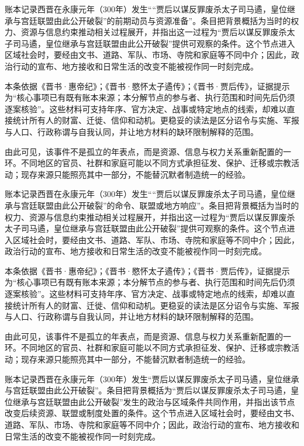 账本记录西晋在永康元年（300年）发生““贾后以谋反罪废杀太子司马遹，皇位继承与宫廷联盟由此公开破裂”的前期动员与资源准备”。条目把背景概括为当时的权力、资源与信息约束推动相关过程展开，并指出这一过程为“贾后以谋反罪废杀太子司马遹，皇位继承与宫廷联盟由此公开破裂”提供可观察的条件。这个节点进入区域社会时，要经由文书、道路、军队、市场、寺院和家庭等不同中介；因此，政治行动的宣布、地方接收和日常生活的改变不能被视作同一时刻完成。

本条依据《晋书·惠帝纪》；《晋书·愍怀太子遹传》；《晋书·贾后传》，证据提示为“核心事项已有既有账本来源；本分解节点的参与者、执行范围和时间先后仍须逐案核验”。这些材料可支持年序、官方决定、战事或特定地点的线索，却难以直接统计所有人的财富、迁徙、信仰和动机。更稳妥的读法是区分诏令与实施、军报与人口、行政称谓与自我认同，并让地方材料的缺环限制解释的范围。

由此可见，该事件不是孤立的年表点，而是资源、信息与权力关系重新配置的一环。不同地区的官员、社群和家庭可能以不同方式承担征发、保护、迁移或宗教活动；现存来源只能照亮其中一部分，不能替沉默者制造统一的经验。

账本记录西晋在永康元年（300年）发生““贾后以谋反罪废杀太子司马遹，皇位继承与宫廷联盟由此公开破裂”的命令、联盟或地方响应”。条目把背景概括为当时的权力、资源与信息约束推动相关过程展开，并指出这一过程为“贾后以谋反罪废杀太子司马遹，皇位继承与宫廷联盟由此公开破裂”提供可观察的条件。这个节点进入区域社会时，要经由文书、道路、军队、市场、寺院和家庭等不同中介；因此，政治行动的宣布、地方接收和日常生活的改变不能被视作同一时刻完成。

本条依据《晋书·惠帝纪》；《晋书·愍怀太子遹传》；《晋书·贾后传》，证据提示为“核心事项已有既有账本来源；本分解节点的参与者、执行范围和时间先后仍须逐案核验”。这些材料可支持年序、官方决定、战事或特定地点的线索，却难以直接统计所有人的财富、迁徙、信仰和动机。更稳妥的读法是区分诏令与实施、军报与人口、行政称谓与自我认同，并让地方材料的缺环限制解释的范围。

由此可见，该事件不是孤立的年表点，而是资源、信息与权力关系重新配置的一环。不同地区的官员、社群和家庭可能以不同方式承担征发、保护、迁移或宗教活动；现存来源只能照亮其中一部分，不能替沉默者制造统一的经验。

账本记录西晋在永康元年（300年）发生“贾后以谋反罪废杀太子司马遹，皇位继承与宫廷联盟由此公开破裂”。条目把背景概括为“贾后以谋反罪废杀太子司马遹，皇位继承与宫廷联盟由此公开破裂”发生的政治与区域条件共同作用，并指出该节点改变后续资源、联盟或制度处置的条件。这个节点进入区域社会时，要经由文书、道路、军队、市场、寺院和家庭等不同中介；因此，政治行动的宣布、地方接收和日常生活的改变不能被视作同一时刻完成。


